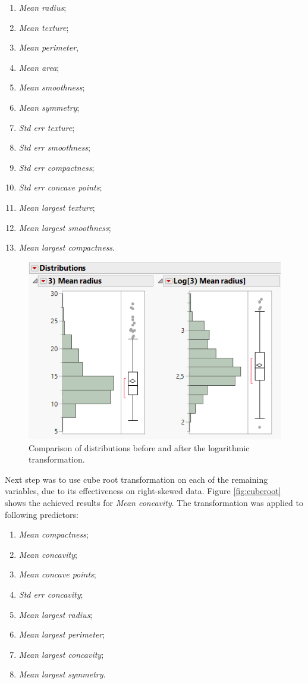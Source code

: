 	\begin{enumerate}
		\item \textit{Mean radius};
		\item \textit{Mean texture};
		\item \textit{Mean perimeter},
		\item \textit{Mean area};
		\item \textit{Mean smoothness};
		\item \textit{Mean symmetry};
		\item \textit{Std err texture};
		\item \textit{Std err smoothness};
		\item \textit{Std err compactness};
		\item \textit{Std err concave points};
		\item \textit{Mean largest texture};
		\item \textit{Mean largest smoothness};
		\item \textit{Mean largest compactness}.
	\end{enumerate}

	\begin{figure}[!ht]
		\centering
		\includegraphics[width=0.7\linewidth]{Rysunki/Rozdzial3/log}
		\caption{Comparison of distributions before and after the logarithmic transformation.}
		\label{fig:log}
	\end{figure}

	Next step was to use cube root transformation on each of the remaining variables, due to its effectiveness on right-skewed data. Figure \ref{fig:cuberoot} shows the achieved results for \textit{Mean concavity}. The transformation was applied to following predictors:
	
	\begin{enumerate}
		\item \textit{Mean compactness};
		\item \textit{Mean concavity};
		\item \textit{Mean concave points};
		\item \textit{Std err concavity};
		\item \textit{Mean largest radius};
		\item \textit{Mean largest perimeter};
		\item \textit{Mean largest concavity};
		\item \textit{Mean largest symmetry}.
	\end{enumerate} 

